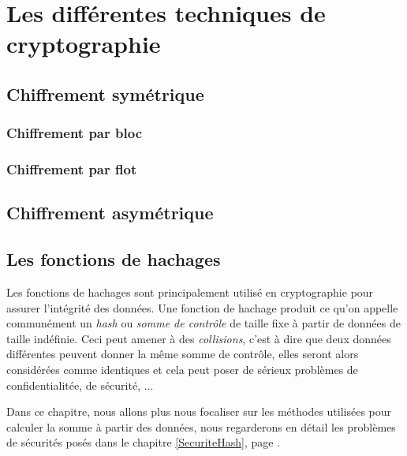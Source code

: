 \chapter{Les différentes techniques de cryptographie}





\section{Chiffrement symétrique}
\subsection{Chiffrement par bloc}
\subsection{Chiffrement par flot}

\section{Chiffrement asymétrique}

\section{Les fonctions de hachages}
Les fonctions de hachages sont principalement utilisé en cryptographie
pour assurer l'intégrité des données. Une fonction de hachage produit
ce qu'on appelle communément un \emph{hash} ou \emph{somme de
  contrôle}  de taille fixe à partir de
données de taille indéfinie. Ceci peut amener à des \emph{collisions},
c'est à dire que deux données différentes peuvent donner la même somme
de contrôle, elles seront alors considérées comme identiques et cela
peut poser de sérieux problèmes de confidentialitée, de sécurité, ...

Dans ce chapitre, nous allons plus nous focaliser sur les méthodes
utilisées pour calculer la somme à partir des données, nous
regarderons en détail les problèmes de sécurités posés dans le
chapitre \ref{SecuriteHash}, page \pageref{SecuriteHash}.


